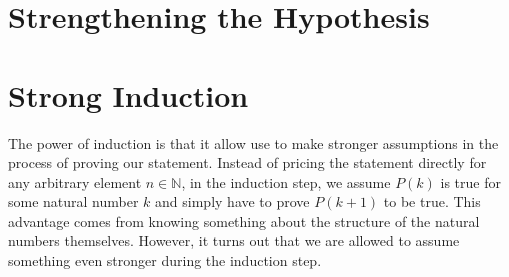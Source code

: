 \documentclass[twoside]{report}
\begin{document}
\section{Strengthening the Hypothesis}


\section{Strong Induction}


The power of induction is that it allow use to make stronger assumptions in the process of proving our statement. Instead of pricing the statement directly for any arbitrary element $n \in \mathbb{N}$, in the induction step, we assume $P(k)$ is true for some natural number $k$ and simply have to prove $P(k + 1)$ to be true. This advantage comes from knowing something about the structure of the natural numbers themselves. However, it turns out that we are allowed to assume something even stronger during the induction step.
\end{document}
